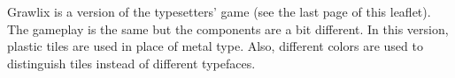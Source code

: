 Grawlix is a version of the typesetters' game (see the last page of this leaflet). The gameplay is the same but the components are a bit different. In this version, plastic tiles are used in place of metal type. Also, different colors are used to distinguish tiles instead of different typefaces.

